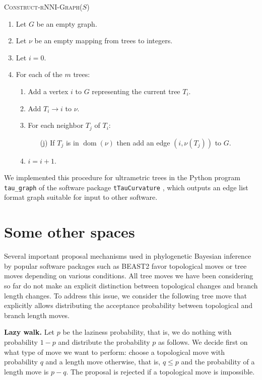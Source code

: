 \documentclass{amsart}
\theoremstyle{definition}
\newcommand{\rnni}{\mathrm{rNNI}}
\newcommand{\dom}{\operatorname{dom}}
\begin{document}
\textsc{Construct-$\rnni$-Graph($S$)}
\begin{enumerate}[1.]
	\item Let $G$ be an empty graph.
	\item Let $\nu$ be an empty mapping from trees to integers.
	\item Let $i = 0$.
	\item For each of the $m$ trees: \vspace{-0.2em}
		\begin{enumerate}
			\item Add a vertex $i$ to $G$ representing the current tree $T_i$.
			\item Add $T_i \rightarrow i$ to $\nu$.
			\item For each neighbor $T_j$ of $T_i$:
				\begin{enumerate}
					\item[(j)] If $T_j$ is in $\dom(\nu)$ then add an edge $(i, \nu(T_j))$ to $G$.
				\end{enumerate}
		\item $i = i + 1$.
		\end{enumerate}
\end{enumerate}

We implemented this procedure for ultrametric trees in the Python program \texttt{tau\_graph}
of the software package \texttt{tTauCurvature} \autocite{tTauCurvature},
which outputs an edge list format graph suitable for input to other software.


\section{Some other spaces}

Several important proposal mechanisms used in phylogenetic Bayesian inference by popular software packages such as BEAST2 \autocite{beast2} favor topological moves or tree moves depending on various conditions.
All tree moves we have been considering so far do not make an explicit distinction between topological changes and branch length changes.
To address this issue, we consider the following tree move that explicitly allows distributing the acceptance probability between topological and branch length moves.

{\bf Lazy walk.}
Let $p$ be the laziness probability, that is, we do nothing with probability $1-p$ and distribute the probability $p$ as follows.
We decide first on what type of move we want to perform: choose a topological move with probability $q$ and a length move otherwise, that is, $q \leq p$ and the probability of a length move is $p-q$.
The proposal is rejected if a topological move is impossible.
\end{document}
